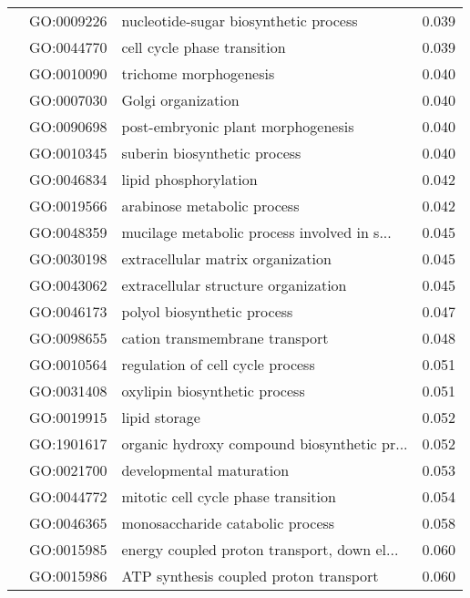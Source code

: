 \begin{longtable}{lllr}
   & GO:0009226 &        nucleotide-sugar biosynthetic process &         0.039 \\
   & GO:0044770 &                  cell cycle phase transition &         0.039 \\
   & GO:0010090 &                       trichome morphogenesis &         0.040 \\
   & GO:0007030 &                           Golgi organization &         0.040 \\
   & GO:0090698 &           post-embryonic plant morphogenesis &         0.040 \\
   & GO:0010345 &                 suberin biosynthetic process &         0.040 \\
   & GO:0046834 &                        lipid phosphorylation &         0.042 \\
   & GO:0019566 &                  arabinose metabolic process &         0.042 \\
   & GO:0048359 &  mucilage metabolic process involved in s... &         0.045 \\
   & GO:0030198 &            extracellular matrix organization &         0.045 \\
   & GO:0043062 &         extracellular structure organization &         0.045 \\
   & GO:0046173 &                  polyol biosynthetic process &         0.047 \\
   & GO:0098655 &               cation transmembrane transport &         0.048 \\
   & GO:0010564 &             regulation of cell cycle process &         0.051 \\
   & GO:0031408 &                oxylipin biosynthetic process &         0.051 \\
   & GO:0019915 &                                lipid storage &         0.052 \\
   & GO:1901617 &  organic hydroxy compound biosynthetic pr... &         0.052 \\
   & GO:0021700 &                     developmental maturation &         0.053 \\
   & GO:0044772 &          mitotic cell cycle phase transition &         0.054 \\
   & GO:0046365 &             monosaccharide catabolic process &         0.058 \\
   & GO:0015985 &  energy coupled proton transport, down el... &         0.060 \\
   & GO:0015986 &       ATP synthesis coupled proton transport &         0.060 \\

\end{longtable}
